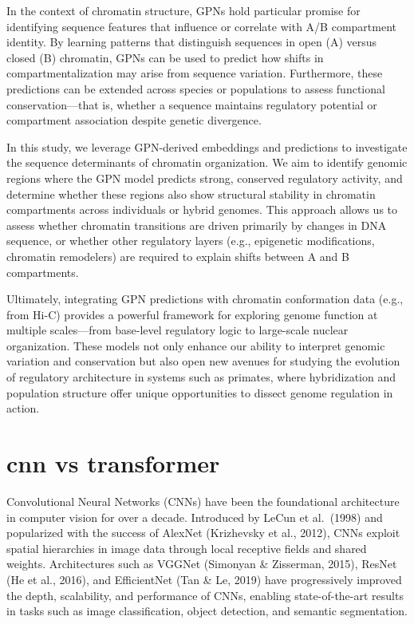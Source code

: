 \documentclass[
  a4paper,
]{scrbook}
\begin{document}
In the context of chromatin structure, GPNs hold particular promise for
identifying sequence features that influence or correlate with A/B
compartment identity. By learning patterns that distinguish sequences in
open (A) versus closed (B) chromatin, GPNs can be used to predict how
shifts in compartmentalization may arise from sequence variation.
Furthermore, these predictions can be extended across species or
populations to assess functional conservation---that is, whether a
sequence maintains regulatory potential or compartment association
despite genetic divergence.

In this study, we leverage GPN-derived embeddings and predictions to
investigate the sequence determinants of chromatin organization. We aim
to identify genomic regions where the GPN model predicts strong,
conserved regulatory activity, and determine whether these regions also
show structural stability in chromatin compartments across individuals
or hybrid genomes. This approach allows us to assess whether chromatin
transitions are driven primarily by changes in DNA sequence, or whether
other regulatory layers (e.g., epigenetic modifications, chromatin
remodelers) are required to explain shifts between A and B compartments.

Ultimately, integrating GPN predictions with chromatin conformation data
(e.g., from Hi-C) provides a powerful framework for exploring genome
function at multiple scales---from base-level regulatory logic to
large-scale nuclear organization. These models not only enhance our
ability to interpret genomic variation and conservation but also open
new avenues for studying the evolution of regulatory architecture in
systems such as primates, where hybridization and population structure
offer unique opportunities to dissect genome regulation in action.

\chapter{cnn vs transformer}\label{cnn-vs-transformer}

Convolutional Neural Networks (CNNs) have been the foundational
architecture in computer vision for over a decade. Introduced by LeCun
et al.~(1998) and popularized with the success of AlexNet (Krizhevsky et
al., 2012), CNNs exploit spatial hierarchies in image data through local
receptive fields and shared weights. Architectures such as VGGNet
(Simonyan \& Zisserman, 2015), ResNet (He et al., 2016), and
EfficientNet (Tan \& Le, 2019) have progressively improved the depth,
scalability, and performance of CNNs, enabling state-of-the-art results
in tasks such as image classification, object detection, and semantic
segmentation.
\end{document}
